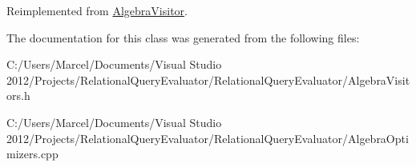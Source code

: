 Reimplemented from \hyperlink{class_algebra_visitor_a681732083691701f0e9c10980392dd3c}{Algebra\+Visitor}.



The documentation for this class was generated from the following files\+:\begin{DoxyCompactItemize}
\item 
C\+:/\+Users/\+Marcel/\+Documents/\+Visual Studio 2012/\+Projects/\+Relational\+Query\+Evaluator/\+Relational\+Query\+Evaluator/Algebra\+Visitors.\+h\item 
C\+:/\+Users/\+Marcel/\+Documents/\+Visual Studio 2012/\+Projects/\+Relational\+Query\+Evaluator/\+Relational\+Query\+Evaluator/Algebra\+Optimizers.\+cpp\end{DoxyCompactItemize}
